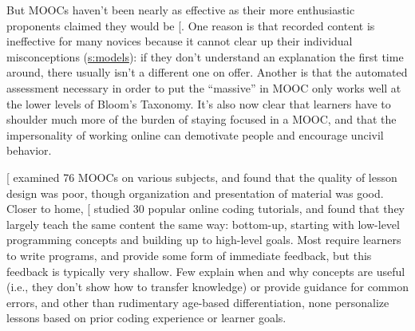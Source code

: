 But MOOCs haven't been nearly as effective as their more enthusiastic
proponents claimed they would be {[}\protect[\hyperlink{b:Ubel2017}{Ubel2017}]{]}. One reason is that
recorded content is ineffective for many novices because it cannot clear
up their individual misconceptions (\protect\hyperlink{CHAPTER}{s:models}): if they
don't understand an explanation the first time around, there usually
isn't a different one on offer. Another is that the automated assessment
necessary in order to put the ``massive'' in MOOC only works well at the
lower levels of Bloom's Taxonomy. It's also now clear that learners have
to shoulder much more of the burden of staying focused in a MOOC, and
that the impersonality of working online can demotivate people and
encourage uncivil behavior.

{[}\protect[\hyperlink{b:Marg2015}{Marg2015}]{]} examined 76 MOOCs on various subjects, and found that
the quality of lesson design was poor, though organization and
presentation of material was good. Closer to home, {[}\protect[\hyperlink{b:Kim2017}{Kim2017}]{]}
studied 30 popular online coding tutorials, and found that they largely
teach the same content the same way: bottom-up, starting with low-level
programming concepts and building up to high-level goals. Most require
learners to write programs, and provide some form of immediate feedback,
but this feedback is typically very shallow. Few explain when and why
concepts are useful (i.e., they don't show how to transfer knowledge) or
provide guidance for common errors, and other than rudimentary age-based
differentiation, none personalize lessons based on prior coding
experience or learner goals.

